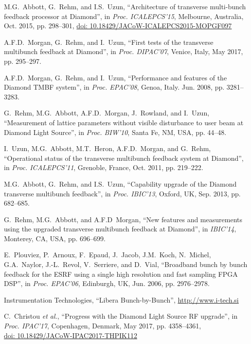 \documentclass[
    a4paper,
    keeplastbox,            %
    hyphens,                %
]{jacow}
\begin{document}
\begin{thebibliography}{99}

M.G.~Abbott, G.~Rehm, and I.S.~Uzun, \enquote{Architecture of transverse multi-bunch
feedback processor at Diamond}, in \emph{Proc. ICALEPCS'15}, Melbourne, Australia, 
Oct. 2015, pp. 298--301, 
\url{doi: 10.18429/JACoW-ICALEPCS2015-MOPGF097}

A.F.D.~Morgan, G.~Rehm, and I.~Uzun, \enquote{First tests of the transverse
multibunch feedback at Diamond}, in \emph{Proc. DIPAC'07}, Venice, Italy, May 2017, 
pp. 295--297.

A.F.D.~Morgan, G.~Rehm, and I.~Uzun, \enquote{Performance and features of the
Diamond TMBF system}, in \emph{Proc. EPAC'08}, Genoa, Italy. Jun. 2008, pp. 3281--3283.

G.~Rehm, M.G.~Abbott, A.F.D.~Morgan, J.~Rowland, and I.~Uzun, \enquote{Measurement
of lattice parameters without visible disturbance to user beam at Diamond Light
Source}, in \emph{Proc. BIW'10}, Santa Fe, NM, USA, pp. 44--48.

I.~Uzun, M.G.~Abbott, M.T.~Heron, A.F.D.~Morgan, and G.~Rehm, \enquote{Operational
status of the transverse multibunch feedback system at Diamond}, 
in \emph{Proc. ICALEPCS'11}, Grenoble, France, Oct. 2011, pp. 219--222.

M.G.~Abbott, G.~Rehm, and I.S.~Uzun, \enquote{Capability upgrade of the Diamond
transverse multibunch feedback}, in \emph{Proc. IBIC'13},
Oxford, UK, Sep. 2013, pp. 682--685.

G.~Rehm, M.G.~Abbott, and A.F.D~Morgan, \enquote{New features and measurements using
the upgraded transverse multibunch feedback at Diamond}, in \emph{IBIC'14}, 
Monterey, CA, USA, pp. 696--699.

E.~Plouviez, P.~Arnoux, F.~Epaud, J.~Jacob, J.M.~Koch, N.~Michel, G.A.~Naylor,
J.\mbox{-}L.~Revol, V.~Serriere, and D.~Vial, \enquote{Broadband bunch by bunch
feedback for the ESRF using a single high resolution and fast sampling FPGA
DSP}, in \emph{Proc. EPAC'06}, Edinburgh, UK, Jun. 2006, pp. 2976--2978.

Instrumentation Technologies, \enquote{Libera Bunch-by-Bunch},
\url{http://www.i-tech.si}

C.~Christou \emph{et al.}, \enquote{Progress with the Diamond Light Source RF upgrade},
in \emph{Proc. IPAC'17},  Copenhagen, Denmark, May 2017, pp. 4358--4361,\\
\url{doi: 10.18429/JACoW-IPAC2017-THPIK112}


\end{thebibliography}
\end{document}
